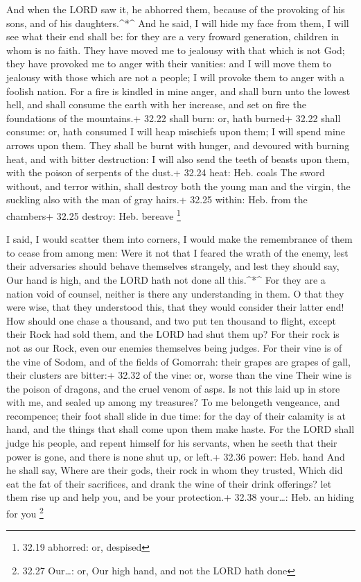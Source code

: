  And when the LORD saw it, he abhorred them, because of the
provoking of his sons, and of his daughters.\^{}*\^{}  And
he said, I will hide my face from them, I will see what their end shall
be: for they are a very froward generation, children in whom is no
faith.  They have moved me to jealousy with that which is
not God; they have provoked me to anger with their vanities: and I will
move them to jealousy with those which are not a people; I will provoke
them to anger with a foolish nation.  For a fire is kindled
in mine anger, and shall burn unto the lowest hell, and shall consume
the earth with her increase, and set on fire the foundations of the
mountains.+ 32.22 shall burn: or, hath burned+ 32.22 shall consume: or,
hath consumed  I will heap mischiefs upon them; I will
spend mine arrows upon them.  They shall be burnt with
hunger, and devoured with burning heat, and with bitter destruction: I
will also send the teeth of beasts upon them, with the poison of
serpents of the dust.+ 32.24 heat: Heb. coals  The sword
without, and terror within, shall destroy both the young man and the
virgin, the suckling also with the man of gray hairs.+ 32.25 within:
Heb. from the chambers+ 32.25 destroy: Heb. bereave \footnote{32.19
  abhorred: or, despised}

 I said, I would scatter them into corners, I would make
the remembrance of them to cease from among men:  Were it
not that I feared the wrath of the enemy, lest their adversaries should
behave themselves strangely, and lest they should say, Our hand is high,
and the LORD hath not done all this.\^{}*\^{}  For they are
a nation void of counsel, neither is there any understanding in them.
 O that they were wise, that they understood this, that
they would consider their latter end!  How should one chase
a thousand, and two put ten thousand to flight, except their Rock had
sold them, and the LORD had shut them up?  For their rock
is not as our Rock, even our enemies themselves being judges.
 For their vine is of the vine of Sodom, and of the fields
of Gomorrah: their grapes are grapes of gall, their clusters are
bitter:+ 32.32 of the vine: or, worse than the vine  Their
wine is the poison of dragons, and the cruel venom of asps.
 Is not this laid up in store with me, and sealed up among
my treasures?  To me belongeth vengeance, and recompence;
their foot shall slide in due time: for the day of their calamity is at
hand, and the things that shall come upon them make haste. 
For the LORD shall judge his people, and repent himself for his
servants, when he seeth that their power is gone, and there is none shut
up, or left.+ 32.36 power: Heb. hand  And he shall say,
Where are their gods, their rock in whom they trusted, 
Which did eat the fat of their sacrifices, and drank the wine of their
drink offerings? let them rise up and help you, and be your protection.+
32.38 your\ldots: Heb. an hiding for you \footnote{32.27 Our\ldots: or,
  Our high hand, and not the LORD hath done}

